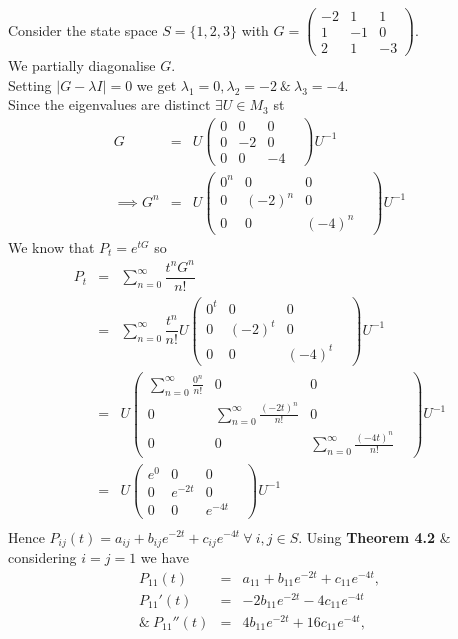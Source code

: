 \documentclass[11pt,a4paper]{article}
\begin{document}
Consider the state space $S=\{1,2,3\}$ with $G=\begin{pmatrix}-2&1&1\\1&-1&0\\2&1&-3\end{pmatrix}$.\\
We partially diagonalise $G$.\\
Setting $|G-\lambda I|=0$ we get $\lambda_1=0,\lambda_2=-2\ \&\ \lambda_3=-4$.\\
Since the eigenvalues are distinct $\exists U\in M_3$ st
\[\begin{array}{rcl}
G&=&U\begin{pmatrix}0&0&0&\\0&-2&0\\0&0&-4\end{pmatrix}U^{-1}\\
\implies G^n&=&U\begin{pmatrix}0^n&0&0&\\0&(-2)^n&0\\0&0&(-4)^n\end{pmatrix}U^{-1}
\end{array}\]
We know that $P_t=e^{tG}$ so
\[\begin{array}{rcl}
P_t&=&\sum\limits_{n=0}^\infty\dfrac{t^nG^n}{n!}\\
&=&\sum\limits_{n=0}^\infty\dfrac{t^n}{n!}U\begin{pmatrix}0^t&0&0&\\0&(-2)^t&0\\0&0&(-4)^t\end{pmatrix}U^{-1}\\
&=&U\begin{pmatrix}\sum_{n=0}^\infty\frac{0^n}{n!}&0&0&\\0&\sum_{n=0}^\infty\frac{(-2t)^n}{n!}&0\\0&0&\sum_{n=0}^\infty\frac{(-4t)^n}{n!}\end{pmatrix}U^{-1}\\
&=&U\begin{pmatrix}e^0&0&0&\\0&e^{-2t}&0\\0&0&e^{-4t}\end{pmatrix}U^{-1}\\
\end{array}\]
Hence $P_{ij}(t)=a_{ij}+b_{ij}e^{-2t}+c_{ij}e^{-4t}\ \forall\ i,j\in S$.
Using \textbf{Theorem 4.2} \& considering $i=j=1$ we have
\[\begin{array}{rcl}
P_{11}(t)&=&a_{11}+b_{11}e^{-2t}+c_{11}e^{-4t},\\
P_{11}'(t)&=&-2b_{11}e^{-2t}-4c_{11}e^{-4t}\\
\&\ P_{11}''(t)&=&4b_{11}e^{-2t}+16c_{11}e^{-4t},\\
\end{array}\]
\end{document}
